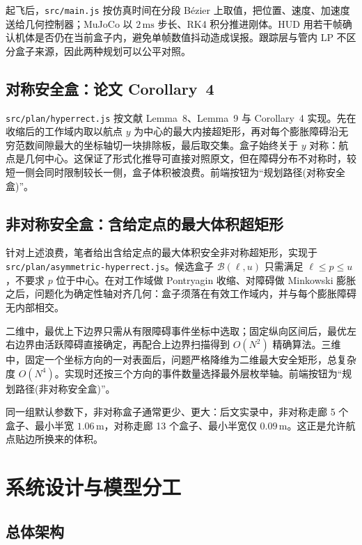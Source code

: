 \documentclass[UTF8,a4paper,11pt,zihao=-4]{ctexart}
\begin{document}
起飞后，\texttt{src/main.js} 按仿真时间在分段 B\'ezier 上取值，把位置、速度、加速度送给几何控制器；MuJoCo 以 $2\,\mathrm{ms}$ 步长、RK4 积分推进刚体。HUD 用若干帧确认机体是否仍在当前盒子内，避免单帧数值抖动造成误报。跟踪层与管内 LP 不区分盒子来源，因此两种规划可以公平对照。

\subsection{对称安全盒：论文 Corollary~4}
\label{sec:sym}

\texttt{src/plan/hyperrect.js} 按文献\cite{serry2026reachavoid} Lemma~8、Lemma~9 与 Corollary~4 实现。先在收缩后的工作域内取以航点 $y$ 为中心的最大内接超矩形，再对每个膨胀障碍沿无穷范数间隙最大的坐标轴切一块排除板，最后取交集。盒子始终关于 $y$ 对称：航点是几何中心。这保证了形式化推导可直接对照原文，但在障碍分布不对称时，较短一侧会同时限制较长一侧，盒子体积被浪费。前端按钮为``规划路径(对称安全盒)''。

\subsection{非对称安全盒：含给定点的最大体积超矩形}
\label{sec:asym}

针对上述浪费，笔者给出含给定点的最大体积安全非对称超矩形\cite{zhu2026asymmetric}，实现于 \texttt{src/plan/asymmetric-hyperrect.js}。候选盒子 $\mathcal B(\ell,u)$ 只需满足 $\ell\le p\le u$，不要求 $p$ 位于中心。在对工作域做 Pontryagin 收缩、对障碍做 Minkowski 膨胀之后，问题化为确定性轴对齐几何：盒子须落在有效工作域内，并与每个膨胀障碍无内部相交。

二维中，最优上下边界只需从有限障碍事件坐标中选取；固定纵向区间后，最优左右边界由活跃障碍直接确定，再配合上边界扫描得到 $O(N^2)$ 精确算法。三维中，固定一个坐标方向的一对表面后，问题严格降维为二维最大安全矩形，总复杂度 $O(N^4)$。实现时还按三个方向的事件数量选择最外层枚举轴。前端按钮为``规划路径(非对称安全盒)''。

同一组默认参数下，非对称盒子通常更少、更大：后文实录中，非对称走廊 5 个盒子、最小半宽 $1.06\,\mathrm{m}$，对称走廊 13 个盒子、最小半宽仅 $0.09\,\mathrm{m}$。这正是允许航点贴边所换来的体积。

\section{系统设计与模型分工}
\label{sec:impl}

\subsection{总体架构}
\end{document}

